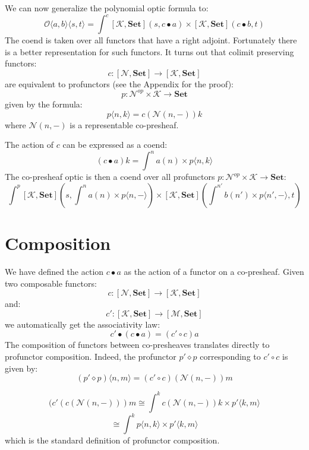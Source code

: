\documentclass[11pt]{amsart}
\newcommand{\cat}[1]{\mathcal{#1}}%
\newcommand{\Cat}[1]{\mathbf{#1}}%
\newcommand{\Set}{\Cat{Set}}
\begin{document}
We can now generalize the polynomial optic formula to:
\[ \mathcal{O}\langle a, b\rangle \langle s, t \rangle = \int^{c} 
 [\cat K, \Set] \left(s,  c \bullet a \right) \times 
 [\cat K, \Set] \left(c \bullet b, t \right) \]
The coend is taken over all functors that have a right adjoint. Fortunately there is a better representation for such functors. It turns out that colimit preserving functors:
\[ c \colon [\cat N, \Set] \to [\cat K, \Set] \]
are equivalent to profunctors (see the Appendix for the proof):
\[ p \colon \cat N^{op} \times \cat K \to \Set \]
given by the formula:
\[p \langle n, k \rangle = c ( \cat N(n, -)) k \]
where $\cat N(n, -)$ is a representable co-presheaf.

The action of $c$ can be expressed as a coend:
\[ (c \bullet a) k = \int^{n} a(n) \times p \langle n, k \rangle \]
The co-presheaf optic is then a coend over all profunctors $p \colon \cat N^{op} \times \cat K \to \Set$:
\[ \int^{p} 
 [\cat K, \Set] \left(s,  \int^{n} a(n) \times p \langle n, - \rangle \right) \times 
 [\cat K, \Set] \left(\int^{n'} b(n') \times p \langle n', - \rangle, t \right) \]
 
 \section{Composition}
 
 We have defined the action $c \bullet a$ as the action of a functor on a co-presheaf. Given two composable functors:
\[ c \colon  [\cat N, \Set] \to [\cat K, \Set] \]
and:
\[ c' \colon  [\cat K, \Set] \to [\cat M, \Set] \]
we automatically get the associativity law:
\[ c' \bullet (c \bullet a) = (c' \circ c) a \]
The composition of functors between co-presheaves translates directly to profunctor composition. Indeed, the profunctor $p' \diamond p$ corresponding to $c' \circ c$ is given by:
\[(p' \diamond p) \langle n, m \rangle = (c' \circ c) ( \cat N(n, -)) m \]

\[(c' ( c ( \cat N(n, -))) m 
 \cong \int^{k} c ( \cat N(n, -)) k \times p' \langle k, m \rangle \]
\[  \cong \int^{k} p \langle n, k \rangle \times p' \langle k, m \rangle \]
which is the standard definition of profunctor composition. 
\end{document}
